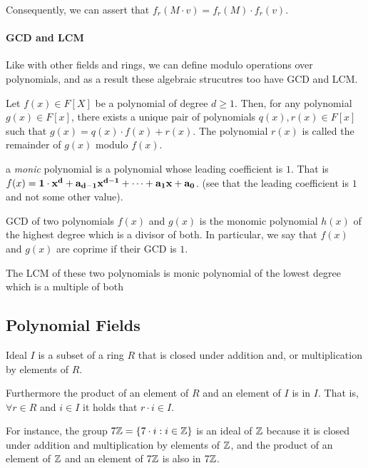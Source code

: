 Consequently, we can assert that $f_r(M\cdot v) = f_r(M)\cdot f_r(v)$.

\paragraph{GCD and LCM}

Like with other fields and rings, 
we can define modulo operations over polynomials, and as a result
these algebraic strucutres too have GCD and LCM.
\begin{definition}
    Let $f(x)\in F[X]$ be a polynomial of degree $d\ge 1$.
    Then, for any polynomial $g(x)\in F[x]$, there exists a unique 
    pair of polynomials $q(x),r(x)\in F[x]$ such that $g(x)=q(x)\cdot f(x) +r(x)$.
    The polynomial $r(x)$ is called the remainder of $g(x)$ modulo $f(x)$.
\end{definition}

\begin{definition}
    a \emph{monic} polynomial is a polynomial whose leading coefficient is $1$.
    That is $f(x)= \bf{1}\cdot x^d + a_{d-1}x^{d-1}+\dots +a_1x+a_0$.
    (see that the leading coefficient is $1$ and not some other value).
\end{definition}

\begin{definition}
    GCD of two polynomials $f(x)$ and $g(x)$ is the monomic polynomial $h(x)$
    of the highest degree which is a divisor of both.
    In particular, we say that $f(x)$ and $g(x)$ are coprime if their GCD is $1$.


    The LCM of these two polynomials is monic polynomial of the lowest 
    degree which is a multiple of both
\end{definition}


\subsection{Polynomial Fields}
\begin{definition}
    Ideal $I$ is a subset of a ring $R$ that is closed under addition and, or multiplication by elements of $R$.

    Furthermore the product of an element of $R$ and an element of $I$ is in $I$.
    That is, $\forall r\in R$ and $i\in I$ it holds that $r\cdot i\in I$.
\end{definition}

For instance, the group $7\mathbb{Z}=\{7\cdot i:i\in\mathbb{Z}\}$ is an ideal of $\mathbb{Z}$ because it is closed
under addition and multiplication by elements of $\mathbb{Z}$,
and the product of an element of $\mathbb{Z}$ and an element of $7\mathbb{Z}$ is also in $7\mathbb{Z}$.

